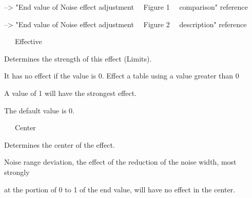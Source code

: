 \documentclass[a4paper,12pt]{article}
\begin{document}
--> "End value of Noise effect adjustment \ \ Figure 1 \ \ comparison" reference\par
--> "End value of Noise effect adjustment \ \ Figure 2 \ \ description" reference\\
\par
\noindent \ \ \, Effective\par
Determines the strength of this effect (Limits).\par
It has no effect if the value is 0. Effect a table using a value greater than 0\par
A value of 1 will have the strongest effect.\par
The default value is 0.\\
\par
\noindent \ \ \, Center\par
Determines the center of the effect.\par
Noise range deviation, the effect of the reduction of the noise width, most strongly\par
at the portion of 0 to 1 of the end value, will have no effect in the center.

\newpage

\thispagestyle{empty}
\end{document}
